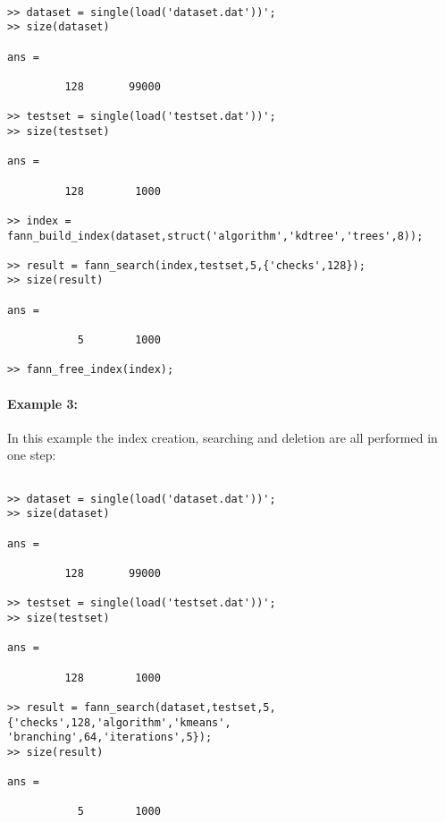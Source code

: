 \documentclass[letter,10pt]{article}
\begin{document}
\begin{Verbatim}[fontsize=\footnotesize,frame=single]

>> dataset = single(load('dataset.dat'))';
>> size(dataset)

ans =

         128       99000

>> testset = single(load('testset.dat'))';
>> size(testset)

ans =

         128        1000

>> index = fann_build_index(dataset,struct('algorithm','kdtree','trees',8));

>> result = fann_search(index,testset,5,{'checks',128});
>> size(result)

ans =

           5        1000

>> fann_free_index(index);

\end{Verbatim}

\paragraph{Example 3:}

In this example the index creation, searching and deletion are all performed in one step:

\begin{Verbatim}[fontsize=\footnotesize,frame=single]

>> dataset = single(load('dataset.dat'))';
>> size(dataset)

ans =

         128       99000

>> testset = single(load('testset.dat'))';
>> size(testset)

ans =

         128        1000

>> result = fann_search(dataset,testset,5,{'checks',128,'algorithm','kmeans',
'branching',64,'iterations',5});
>> size(result)

ans =

           5        1000

\end{Verbatim}
\end{document}
